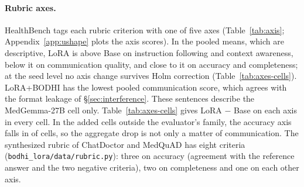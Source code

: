 \documentclass{article}
\newcommand{\bodhi}{BODHI}
\begin{document}
\paragraph{Rubric axes.} HealthBench tags each rubric criterion with one of five axes
(Table~\ref{tab:axis}; Appendix~\ref{app:ushape} plots the axis scores). In the pooled means,
which are descriptive, LoRA is above Base on instruction following and context awareness, below it
on communication quality, and close to it on accuracy and completeness; at the seed level no axis
change survives Holm correction (Table~\ref{tab:axes-cells}). LoRA+\bodhi{} has the lowest pooled
communication score, which agrees with the format leakage of \S\ref{sec:interference}. These sentences describe
the MedGemma-27B cell only. Table~\ref{tab:axes-cells} gives LoRA $-$ Base on each axis in every cell. In
the added cells outside the evaluator's family, the accuracy axis falls in
\statGroupAddedOutsideFamilyAccuracyFell{} of \statGroupAddedOutsideFamilyCells{} cells, so the aggregate
drop is not only a matter of communication. The synthesized rubric of ChatDoctor and MedQuAD has eight criteria
(\texttt{bodhi\_lora/data/rubric.py}): three on accuracy (agreement with the reference answer and the
two negative criteria), two on completeness and one on each other axis.

\begin{table}[!ht]
\centering
\caption{What the aggregate change is made of: LoRA $-$ Base on each rubric axis in every cell, the
mean of the per-seed differences $\pm$ half of the 95\% $t$ interval. $^{*}$: $p < 0.05$ after Holm
over the five axes of the cell. Exploratory. On ChatDoctor and MedQuAD the rubric is synthesized.
$^{\dagger}$Base model in the evaluator's family. $^{\ddagger}$Set aside (\S\ref{sec:cells}).}
\label{tab:axes-cells}
\scriptsize
\setlength{\tabcolsep}{1.5pt}

\end{table}

\begin{table}[!ht]
\centering
\small
\caption{Mean score per HealthBench rubric axis, over the pooled responses of the five seeds.}
\label{tab:axis}

\end{table}
\end{document}
